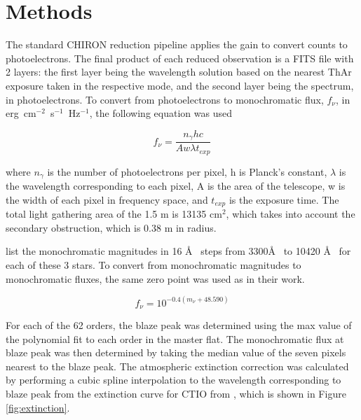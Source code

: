 \documentclass[iop]{emulateapj}
\begin{document}
\section{Methods}

The standard CHIRON reduction pipeline applies the gain to convert counts to photoelectrons. The final product of each reduced observation is a FITS file with 2 layers: the first layer being the wavelength solution based on the nearest ThAr exposure taken in the respective mode, and the second layer being the spectrum, in photoelectrons. To convert from photoelectrons to monochromatic flux, $f_{\nu}$, in erg~cm$^{-2}$~s$^{-1}$~Hz$^{-1}$, the following equation was used

\begin{equation}
f_{\nu} = \frac{n_{\gamma} h c}{A w \lambda t_{exp} }
\end{equation}

where $n_{\gamma}$ is the number of photoelectrons per pixel, h is Planck's constant, $\lambda$ is the wavelength corresponding to each pixel, A is the area of the telescope, w is the width of each pixel in frequency space, and $t_{exp}$ is the exposure time. The total light gathering area of the 1.5 m is 13135 cm$^{2}$, which takes into account the secondary obstruction, which is 0.38 m in radius.

\citet{1994PASP..106..566H} list the monochromatic magnitudes in 16 \AA~ steps from 3300\AA~ to 10420 \AA~ for each of these 3 stars. To convert from monochromatic magnitudes to monochromatic fluxes, the same zero point was used as in their work.

\begin{equation}
f_{\nu} = 10^{-0.4(m_{\nu} + 48.590)}
\end{equation}

For each of the 62 orders, the blaze peak was determined using the max value of the polynomial fit to each order in the master flat. The monochromatic flux at blaze peak was then determined by taking the median value of the seven pixels nearest to the blaze peak. The atmospheric extinction correction was calculated by performing a cubic spline interpolation to the wavelength corresponding to blaze peak from the extinction curve for CTIO from \citep{Stritzinger:2005dt}, which is shown in Figure \ref{fig:extinction}.
\end{document}
